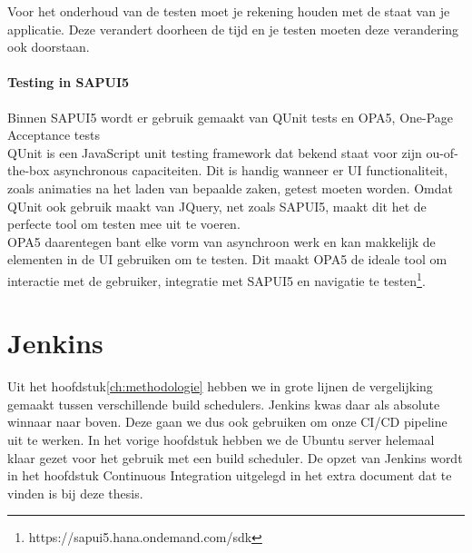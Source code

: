 Voor het onderhoud van de testen moet je rekening houden met de staat van je applicatie. Deze verandert doorheen de tijd en je testen moeten deze verandering ook doorstaan.

    \paragraph{Testing in SAPUI5}
    Binnen SAPUI5 wordt er gebruik gemaakt van QUnit tests en OPA5, One-Page Acceptance tests\\
    QUnit is een JavaScript unit testing framework dat bekend staat voor zijn ou-of-the-box asynchronous capaciteiten. Dit is handig wanneer er UI functionaliteit, zoals animaties na het laden van bepaalde zaken, getest moeten worden. Omdat QUnit ook gebruik maakt van JQuery, net zoals SAPUI5, maakt dit het de perfecte tool om testen mee uit te voeren.\\
    OPA5 daarentegen bant elke vorm van asynchroon werk en kan makkelijk de elementen in de UI gebruiken om te testen. Dit maakt OPA5 de ideale tool om interactie met de gebruiker, integratie met SAPUI5 en navigatie te testen\footnote{https://sapui5.hana.ondemand.com/sdk}.

\section{Jenkins}
\label{sec:short-list}
Uit het hoofdstuk\ref{ch:methodologie} hebben we in grote lijnen de vergelijking gemaakt tussen verschillende build schedulers. Jenkins kwas daar als absolute winnaar naar boven. Deze gaan we dus ook gebruiken om onze CI/CD pipeline uit te werken.
In het vorige hoofdstuk hebben we de Ubuntu server helemaal klaar gezet voor het gebruik met een build scheduler. De opzet van Jenkins wordt in het hoofdstuk Continuous Integration uitgelegd in het extra document dat te vinden is bij deze thesis.

